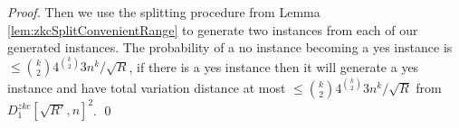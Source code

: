 \begin{proof}
	Then we use the splitting procedure from Lemma \ref{lem:zkcSplitConvenientRange} to generate two instances from each of our generated instances. The probability of a no instance becoming a yes instance is $\leq \binom{k}{2}4^{\binom{k}{2}}3 n^k/\sqrt{R}$, if there is a yes instance then it will generate a yes instance and have total variation distance at most $\leq \binom{k}{2}4^{\binom{k}{2}}3 n^k/\sqrt{R}$ from $D^{zkc}_{1}[\sqrt{R'},n]^2$. \qed
\end{proof}
